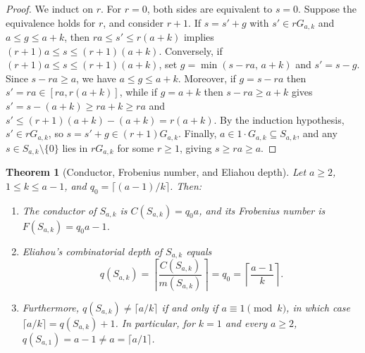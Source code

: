 \documentclass[11pt]{amsart}
\newtheorem{theorem}{Theorem}[section]
\theoremstyle{definition}
\theoremstyle{remark}
\newcommand{\ceil}[1]{\left\lceil #1 \right\rceil}
\begin{document}
\begin{proof}
We induct on $r$. For $r = 0$, both sides are equivalent to $s = 0$. Suppose the equivalence holds for $r$, and consider $r + 1$. If $s = s' + g$ with $s' \in r G_{a,k}$ and $a \le g \le a+k$, then $ra \le s' \le r(a+k)$ implies $(r+1)a \le s \le (r+1)(a+k)$. Conversely, if $(r+1)a \le s \le (r+1)(a+k)$, set $g = \min(s - ra,\, a+k)$ and $s' = s - g$. Since $s - ra \ge a$, we have $a \le g \le a+k$. Moreover, if $g = s - ra$ then $s' = ra \in [ra, r(a+k)]$, while if $g = a+k$ then $s - ra \ge a+k$ gives $s' = s - (a+k) \ge ra + k \ge ra$ and $s' \le (r+1)(a+k) - (a+k) = r(a+k)$. By the induction hypothesis, $s' \in r G_{a,k}$, so $s = s' + g \in (r+1)G_{a,k}$. Finally, $a \in 1 \cdot G_{a,k} \subseteq S_{a,k}$, and any $s \in S_{a,k} \setminus \{0\}$ lies in $r G_{a,k}$ for some $r \ge 1$, giving $s \ge ra \ge a$.
\end{proof}

\begin{theorem}[Conductor, Frobenius number, and Eliahou depth]
\label{thm:eliahou}
Let $a \ge 2$, $1 \le k \le a-1$, and $q_0 = \lceil (a-1)/k \rceil$. Then:
\begin{enumerate}
  \item[(i)] The conductor of $S_{a,k}$ is $C(S_{a,k}) = q_0 a$, and its Frobenius number is $F(S_{a,k}) = q_0 a - 1$.
  \item[(ii)] Eliahou's combinatorial depth of $S_{a,k}$ equals
  \[
    q(S_{a,k}) = \ceil{\frac{C(S_{a,k})}{m(S_{a,k})}} = q_0 = \ceil{\frac{a-1}{k}}.
  \]
  \item[(iii)] Furthermore, $q(S_{a,k}) \ne \lceil a/k \rceil$ if and only if $a \equiv 1 \pmod{k}$, in which case $\lceil a/k \rceil = q(S_{a,k}) + 1$. In particular, for $k = 1$ and \emph{every} $a \ge 2$, $q(S_{a,1}) = a - 1 \ne a = \lceil a/1 \rceil$.
\end{enumerate}
\end{theorem}
\end{document}

